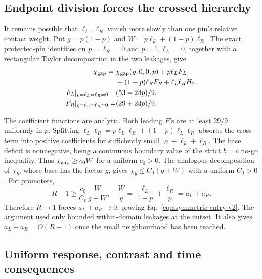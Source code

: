 \documentclass[aps,pre,reprint,amsmath,amssymb,longbibliography]{revtex4-2}
\begin{document}
\subsection{Endpoint division forces the crossed hierarchy}

It remains possible that $\ell_L,\ell_R$ vanish more slowly
than one pin's relative contact weight. Put $g=p(1-p)$ and
$W=p\ell_L+(1-p)\ell_R$. The exact protected-pin identities on
$p=\ell_R=0$ and $p=1,\ell_L=0$, together with a rectangular
Taylor decomposition in the two leakages, give
\begin{equation}
 \begin{aligned}
 \chi_{\rm gap}={}&\chi_{\rm gap}(\varrho,0,0,p)
       +p\ell_L F_L\\
 &+(1-p)\ell_R F_R+\ell_L\ell_R H_2,\\
 F_L|_{\varrho=\ell_L=\ell_R=0}=&(53-24p)/9,\\
 F_R|_{\varrho=\ell_L=\ell_R=0}=&(29+24p)/9.
 \end{aligned}
 \label{eq:asym-positive-division-v2}
\end{equation}

The coefficient functions are analytic. Both leading $F$'s
are at least $29/9$ uniformly in $p$. Splitting
$\ell_L\ell_R=p\ell_L\ell_R+(1-p)\ell_L\ell_R$ absorbs the
cross term into positive coefficients for sufficiently small
$\varrho+\ell_L+\ell_R$. The base deficit is nonnegative, being
a continuous boundary value of the strict $b=c$ no-go inequality.
Thus $\chi_{\rm gap}\ge c_0W$ for a uniform $c_0>0$. The analogous
decomposition of $\chi_b$, whose base has the factor $g$, gives
$\chi_b\le C_0(g+W)$ with a uniform $C_0>0$. For promoters,
\begin{equation}
 R-1\ge\frac {c_0}{C_0}\frac{W}{g+W},\quad
 \frac{W}{g}=\frac{\ell_L}{1-p}+\frac{\ell_R}{p}=a_L+a_R.
 \label{eq:asym-forced-crossing-v2}
\end{equation}
Therefore $R\to1$ forces $a_L+a_R\to0$, proving
Eq.~\eqref{eq:asymmetric-entry-v2}. The argument used only bounded
within-domain leakages at the outset. It also gives
$a_L+a_R=O(R-1)$ once the small neighbourhood has been reached.

\subsection{Uniform response, contrast and time consequences}
\end{document}
